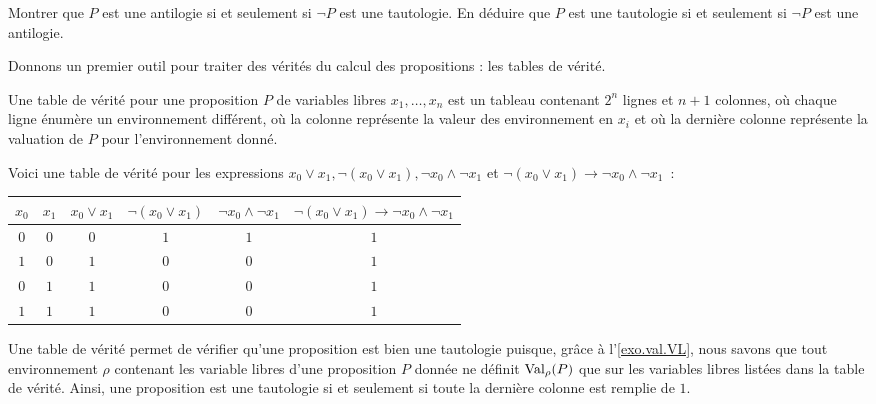 \begin{exercise}
  Montrer que $P$ est une antilogie si et seulement si $\lnot P$ est une
  tautologie. En déduire que $P$ est une tautologie si et seulement si $\lnot P$
  est une antilogie.
\end{exercise}

Donnons un premier outil pour traiter des vérités du calcul des propositions :
les tables de vérité.

\begin{definition}
  Une table de vérité pour une proposition $P$ de variables libres
  $x_1,\ldots,x_n$ est un tableau contenant $2^n$ lignes et $n+1$ colonnes, où
  chaque ligne énumère un environnement différent, où la
   colonne représente la valeur des environnement en
  $x_i$ et où la dernière colonne représente la valuation de $P$ pour
  l'environnement donné.
\end{definition}

\begin{example}
  Voici une table de vérité pour les expressions
  $x_0\lor x_1, \lnot (x_0\lor x_1), \lnot x_0\land \lnot x_1$ et
  $\lnot (x_0 \lor x_1)\to \lnot x_0 \land \lnot x_1$~:
  \begin{center}
    \begin{tabular}{|c|c|c|c|c|c|}
      \hline $x_0$ & $x_1$ & $x_0\lor x_1$ & $\lnot (x_0\lor x_1)$ &
      $\lnot x_0 \land \lnot x_1$ &
      $\lnot (x_0 \lor x_1)\to \lnot x_0 \land \lnot x_1$\\
      \hline $0$ & $0$ & $0$ & $1$ & $1$ & $1$ \\
      \hline $1$ & $0$ & $1$ & $0$ & $0$ & $1$ \\
      \hline $0$ & $1$ & $1$ & $0$ & $0$ & $1$ \\
      \hline $1$ & $1$ & $1$ & $0$ & $0$ & $1$ \\
      \hline
    \end{tabular}
  \end{center}
\end{example}

Une table de vérité permet de vérifier qu'une proposition est bien une
tautologie puisque, grâce à l'\cref{exo.val.VL}, nous savons que tout
environnement $\rho$ contenant les variable libres d'une proposition $P$ donnée
ne définit $\operatorname{Val}_\rho(P)$ que sur les variables libres listées dans la table de
vérité. Ainsi, une proposition est une tautologie si et seulement si toute la
dernière colonne est remplie de $1$.

